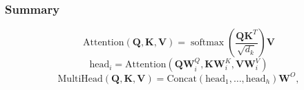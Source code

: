 \documentclass{beamer}
\DeclareMathOperator*{\softmax}{softmax}
\begin{document}
\begin{frame}
  \frametitle{Summary}

  \begin{displaymath}
    \text{Attention}(\bm{Q},\bm{K},\bm{V}) =
    \softmax\left(\frac{\bm{Q}\bm{K}^T}{\sqrt{d_k}}\right)\bm{V}
  \end{displaymath}
  \begin{displaymath}
    \text{head}_i =
    \text{Attention}\left(\bm{Q}\bm{W}_i^Q,\bm{K}\bm{W}_i^K,\bm{V}\bm{W}_i^V\right)
  \end{displaymath}
  \begin{displaymath}
    \text{MultiHead}(\bm{Q},\bm{K},\bm{V}) = \text{Concat}(\text{head}_1,\ldots,\text{head}_h)\bm{W}^O,
  \end{displaymath}

\end{frame}
\end{document}
